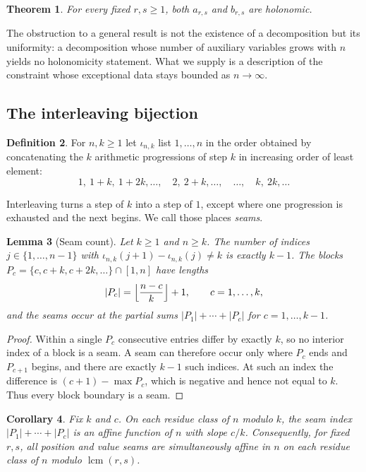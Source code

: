 \documentclass[11pt]{article}
\newtheorem{theorem}{Theorem}[section]
\newtheorem{lemma}[theorem]{Lemma}
\newtheorem{corollary}[theorem]{Corollary}
\theoremstyle{definition}
\newtheorem{definition}[theorem]{Definition}
\begin{document}
\begin{theorem}\label{thm:hol}
For every fixed $r,s\ge 1$, both $a_{r,s}$ and $b_{r,s}$ are holonomic.
\end{theorem}

The obstruction to a general result is not the existence of a decomposition but
its uniformity: a decomposition whose number of auxiliary variables grows with
$n$ yields no holonomicity statement. What we supply is a description of the
constraint whose exceptional data stays bounded as $n\to\infty$.

\subsection{The interleaving bijection}

\begin{definition}
For $n,k\ge 1$ let $\iota_{n,k}$ list $1,\dots,n$ in the order obtained by
concatenating the $k$ arithmetic progressions of step $k$ in increasing order
of least element:
\[
  1,\ 1+k,\ 1+2k,\dots,\quad 2,\ 2+k,\dots,\quad\dots,\quad k,\ 2k,\dots
\]
\end{definition}

Interleaving turns a step of $k$ into a step of $1$, except where one
progression is exhausted and the next begins. We call those places
\emph{seams}.

\begin{lemma}[Seam count]\label{lem:seam}
Let $k\ge1$ and $n\ge k$. The number of indices $j\in\{1,\dots,n-1\}$ with
$\iota_{n,k}(j+1)-\iota_{n,k}(j)\ne k$ is exactly $k-1$. The blocks
$P_c=\{c,c+k,c+2k,\dots\}\cap[1,n]$ have lengths
\begin{equation}\label{eq:blocklen}
  |P_c|=\Bigl\lfloor\frac{n-c}{k}\Bigr\rfloor+1,\qquad c=1,\dots,k,
\end{equation}
and the seams occur at the partial sums $|P_1|+\cdots+|P_c|$ for
$c=1,\dots,k-1$.
\end{lemma}

\begin{proof}
Within a single $P_c$ consecutive entries differ by exactly $k$, so no interior
index of a block is a seam. A seam can therefore occur only where $P_c$ ends
and $P_{c+1}$ begins, and there are exactly $k-1$ such indices. At such an
index the difference is $(c+1)-\max P_c$, which is negative and hence not equal
to $k$. Thus every block boundary is a seam.
\end{proof}

\begin{corollary}\label{cor:affine}
Fix $k$ and $c$. On each residue class of $n$ modulo $k$, the seam index
$|P_1|+\cdots+|P_c|$ is an affine function of $n$ with slope $c/k$.
Consequently, for fixed $r,s$, all position and value seams are simultaneously
affine in $n$ on each residue class of $n$ modulo $\operatorname{lcm}(r,s)$.
\end{corollary}
\end{document}
